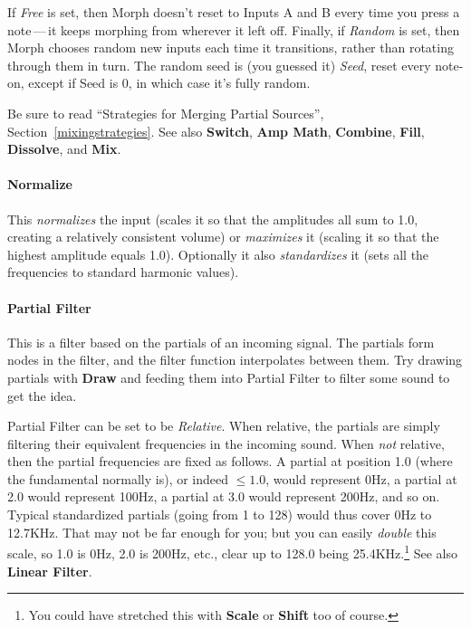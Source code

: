 \documentclass{article}
\begin{document}


If {\it Free} is set, then Morph doesn't reset to Inputs A and B every time you press a note\,---\,it keeps morphing from wherever it left off.  Finally, if {\it Random} is set, then Morph chooses random new inputs each time it transitions, rather than rotating through them in turn. The random seed is (you guessed it) {\it Seed}, reset every note-on, except if Seed is 0, in which case it's fully random.  

Be sure to read ``Strategies for Merging Partial Sources'', Section~\ref{mixingstrategies}.  See also {\bf Switch}, {\bf Amp Math},  {\bf Combine}, {\bf Fill}, {\bf Dissolve}, and {\bf Mix}.

\paragraph{Normalize} This {\it normalizes} the input (scales it so that the amplitudes all sum to 1.0, creating a relatively consistent volume) or {\it maximizes} it (scaling it so that the highest amplitude equals 1.0).  Optionally it also {\it standardizes} it (sets all the frequencies to standard harmonic values).

\paragraph{Partial Filter} This is a filter based on the partials of an incoming signal.  The partials form nodes in the filter, and the filter function interpolates between them.  Try drawing partials with {\bf Draw} and feeding them into Partial Filter to filter some sound to get the idea.  

Partial Filter can be set to be {\it Relative}.  When relative, the partials are simply filtering their equivalent frequencies in the incoming sound.  When {\it not} relative, then the partial frequencies are fixed as follows.  A partial at position 1.0 (where the fundamental normally is), or indeed \(\leq 1.0\), would represent 0Hz, a partial at 2.0 would represent 100Hz, a partial at 3.0 would represent 200Hz, and so on.  Typical standardized partials (going from 1 to 128) would thus cover 0Hz to 12.7KHz.  That may not be far enough for you; but you can easily {\it double} this scale, so 1.0 is 0Hz, 2.0 is 200Hz, etc., clear up to 128.0 being 25.4KHz.\footnote{You could have stretched this with {\bf Scale} or {\bf Shift} too of course.}  See also {\bf Linear Filter}.
\end{document}
